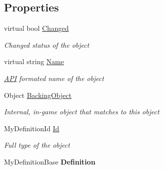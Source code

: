 \subsection*{Properties}
\begin{DoxyCompactItemize}
\item 
virtual bool \hyperlink{class_s_e_mod_a_p_i_internal_1_1_a_p_i_1_1_entity_1_1_base_object_aab86a71ad2e8329d6690b6afeb555cf0}{Changed}
\begin{DoxyCompactList}\small\item\em Changed status of the object \end{DoxyCompactList}\item 
virtual string \hyperlink{class_s_e_mod_a_p_i_internal_1_1_a_p_i_1_1_entity_1_1_base_object_ad5da23e54b967012eebf44069168532a}{Name}
\begin{DoxyCompactList}\small\item\em \hyperlink{namespace_s_e_mod_a_p_i_internal_1_1_a_p_i}{A\+P\+I} formated name of the object \end{DoxyCompactList}\item 
Object \hyperlink{class_s_e_mod_a_p_i_internal_1_1_a_p_i_1_1_entity_1_1_base_object_ae5eb188e3868ea4b3cbb1e64f738a20f}{Backing\+Object}
\begin{DoxyCompactList}\small\item\em Internal, in-\/game object that matches to this object \end{DoxyCompactList}\item 
My\+Definition\+Id \hyperlink{class_s_e_mod_a_p_i_internal_1_1_a_p_i_1_1_entity_1_1_base_object_af50a7cd055c8d95c2320141f6ea3a923}{Id}
\begin{DoxyCompactList}\small\item\em Full type of the object \end{DoxyCompactList}\item 
\hypertarget{class_s_e_mod_a_p_i_internal_1_1_a_p_i_1_1_entity_1_1_base_object_a684c6d1aaa0ab9f0522c57b666542125}{}My\+Definition\+Base {\bfseries Definition}\label{class_s_e_mod_a_p_i_internal_1_1_a_p_i_1_1_entity_1_1_base_object_a684c6d1aaa0ab9f0522c57b666542125}


\end{DoxyCompactItemize}
